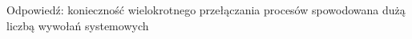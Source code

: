 Odpowiedź: konieczność wielokrotnego przełączania procesów spowodowana dużą liczbą wywołań systemowych
